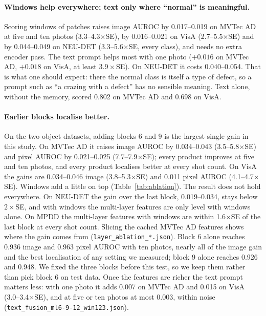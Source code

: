 \documentclass[10pt,twocolumn]{article}
\begin{document}
\paragraph{Windows help everywhere; text only where ``normal'' is meaningful.}
Scoring windows of patches raises image AUROC by 0.017--0.019 on MVTec AD at five
and ten photos (3.3--4.3$\times$SE), by 0.016--0.021 on VisA (2.7--5.5$\times$SE)
and by 0.044--0.049 on NEU-DET (3.3--5.6$\times$SE, every class), and needs no
extra encoder pass. The text prompt helps most with one photo ($+0.016$ on MVTec
AD, $+0.018$ on VisA, at least $3.9\times$SE). On NEU-DET it costs 0.040--0.054.
That is what one should expect: there the normal class is itself a type of defect,
so a prompt such as ``a crazing with a defect'' has no sensible meaning. Text alone,
without the memory, scored 0.802 on MVTec AD and 0.698 on VisA.

\paragraph{Earlier blocks localise better.} On the two object datasets, adding
blocks 6 and 9 is the largest single gain in this study. On MVTec AD it raises
image AUROC by 0.034--0.043 (3.5--5.8$\times$SE) and pixel AUROC by 0.021--0.025
(7.7--7.9$\times$SE); every product improves at five and ten photos, and every
product localises better at every shot count. On VisA the gains are
0.034--0.046 image (3.8--5.3$\times$SE) and 0.011 pixel AUROC (4.1--4.7$\times$SE).
Windows add a little on top (Table~\ref{tab:ablation}). The result does not hold
everywhere. On NEU-DET the gain over the last block, 0.019--0.034, stays below
$2\times$SE, and with windows the multi-layer features are only level with
windows alone. On MPDD the multi-layer features with windows are within
1.6$\times$SE of the last block at every shot count. Slicing the cached MVTec AD
features shows where the gain comes from (\texttt{layer\_ablation\_*.json}).
Block 6 alone reaches 0.936 image and 0.963 pixel AUROC with ten photos, nearly all
of the image gain and the best localisation of any setting we measured; block 9
alone reaches 0.926 and 0.948. We fixed the three blocks before this test, so we
keep them rather than pick block 6 on test data. Once the features are richer the
text prompt matters less: with one photo it adds 0.007 on MVTec AD and 0.015 on
VisA (3.0--3.4$\times$SE), and at five or ten photos at most 0.003, within noise
(\texttt{text\_fusion\_ml6-9-12\_win123.json}).
\end{document}
